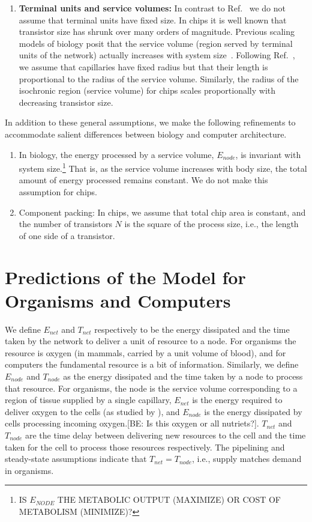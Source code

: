 \documentclass[12pt]{article}
\begin{document}
\begin{enumerate}
\item {\bf Terminal units and service volumes:} In contrast to
  Ref.~\cite{west97} we do not assume that terminal units have fixed size.   In
  chips it is well known that transistor size has shrunk over many orders of
  magnitude.   Previous scaling models of biology posit that the service volume
  (region served by terminal units of the network) actually increases with
  system size~\cite{west97,banavar10}.  Following Ref.~\cite{banavar10}, we
  assume that capillaries have fixed radius but that their length is
  proportional to the radius of the service volume.   Similarly, the radius of
  the isochronic region (service volume) for chips scales proportionally with
  decreasing transistor size.
\end{enumerate}

In addition to these general assumptions, we make the following
refinements to accommodate salient differences between biology and computer architecture.
\begin{enumerate}
\item In biology, the energy processed by a service volume,
  $E_{node}$, is invariant with system size.\footnote{IS $E_{NODE}$ THE METABOLIC OUTPUT (MAXIMIZE) OR COST OF METABOLISM
  (MINIMIZE)?}  That is, as the service volume
  increases with body size, the total amount of energy processed
  remains constant.   We do not make this assumption for chips.

\item Component packing: In chips, we assume that total chip area is constant, and the
  number of transistors $N$ is the square of the process size, i.e.,
  the length of one side of a transistor. 

\end{enumerate}

\section{Predictions of the Model for Organisms and Computers}

We define $E_{net}$ and $T_{net}$ respectively to be the energy dissipated and
the time taken by the network to deliver a unit of resource to a node.  For
organisms the resource is oxygen (in mammals, carried by a unit volume of
blood), and for computers the fundamental resource is a bit of information.
Similarly, we define $E_{node}$ and $T_{node}$ as the energy dissipated and the
time taken by a node to process that resource.  For organisms, the node is the
service volume corresponding to a region of tissue supplied by a single
capillary, $E_{net}$ is the energy required to deliver oxygen to the cells (as
studied by \cite{west97}), and $E_{node}$ is the energy dissipated by cells
processing incoming oxygen.[BE: Is this oxygen or all nutriets?]. $T_{net}$ and
$T_{node}$ are the time delay between delivering new resources to the cell and
the time taken for the cell to process those resources respectively. The
pipelining and steady-state assumptions indicate that $T_{net} = T_{node}$,
i.e., supply matches demand in organisms.
\end{document}
